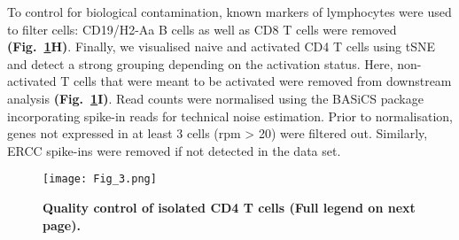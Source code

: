 To control for biological contamination, known markers of lymphocytes were used to filter cells: CD19\plus{}/H2-Aa\plus{} B cells as well as CD8\plus{} T cells were removed \textbf{(Fig.~\ref{fig1:QC}H)}. 
Finally, we visualised naive and activated CD4\plus{} T cells using \gls{tSNE} and detect a strong grouping depending on the activation status. 
Here, non-activated T cells that were meant to be activated were removed from downstream analysis \textbf{(Fig.~\ref{fig1:QC}I)}. 
Read counts were normalised using the BASiCS package \citep{Vallejos2015} incorporating spike-in reads for technical noise estimation. 
Prior to normalisation, genes not expressed in at least 3 cells (rpm > 20) were filtered out. Similarly, ERCC spike-ins were removed if not detected in the data set.

\newpage

\begin{figure}[!hb]
\centering
\texttt{[image: Fig\_3.png]}
\caption[Quality control of isolated CD4\plus{} T cells]{\textbf{Quality control of isolated CD4\plus{} T cells (Full legend on next page).}\\}
\label{fig1:QC}
\end{figure}

\newpage

